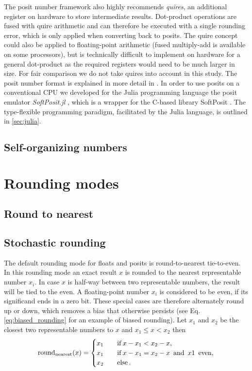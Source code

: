 The posit number framework also highly recommends \emph{quires}, an additional register on hardware to store intermediate results.
Dot-product operations are fused with quire arithmetic and can therefore be executed with a single rounding error, which is only applied
when converting back to posits. The quire concept could also be applied to floating-point arithmetic (fused multiply-add is available on
some processors), but is technically difficult to implement on hardware for a general dot-product as the required registers would need
to be much larger in size. For fair comparison we do not take quires into account in this study. The posit number format is explained in
more detail in \cite{Gustafson2017a}. In order to use posits on a conventional CPU we developed for the Julia programming language
\citep{Bezanson2017} the posit emulator \emph{SoftPosit.jl} \citep{Klower2019a}, which is a wrapper for the C-based library SoftPosit
\citep{Leong2020}. The type-flexible programming paradigm, facilitated by the Julia language, is outlined in \ref{sec:julia}.

\subsection{Self-organizing numbers}
\label{sec:sonums}

\section{Rounding modes}
\label{sec:rounding}

\subsection{Round to nearest}
\label{sec:roundnearest}

	\subsection{Stochastic rounding}
	\label{sec:stochastic_rounding} 

The default rounding mode for floats and posits is round-to-nearest tie-to-even. In this rounding mode an exact result $x$ is rounded
to the nearest representable number $x_i$. In case $x$ is half-way between two representable numbers, the result will be tied to the
even. A floating-point number $x_i$ is considered to be even, if its significand ends in a zero bit. These special cases are therefore
alternately round up or down, which removes a bias that otherwise persists (see Eq. \ref{eq:biased_rounding} for an example of biased rounding).
Let $x_1$ and $x_2$ be the closest two representable numbers to $x$ and $x_1 \leq x < x_2$ then
\begin{equation}
\operatorname{round}_{\operatorname{nearest}}(x) =
\begin{cases}
x_1 \quad &\operatorname{if} x - x_1 < x_2 - x,  \\
x_1 &\operatorname{if} x-x_1 = x_2 - x \operatorname{~and~} x1 \operatorname{~even}, \\
x_2 &\operatorname{else}.
\end{cases}
\label{eq:roundnearest}
\end{equation}

